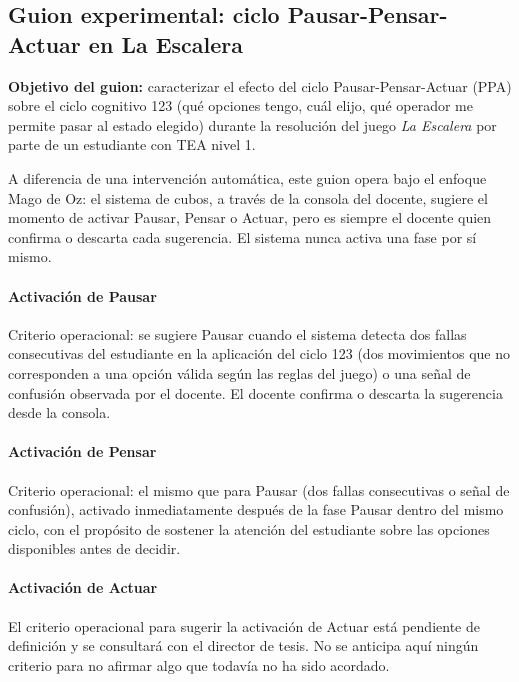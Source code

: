 \documentclass{book}
\begin{document}
\subsection{Guion experimental: ciclo Pausar-Pensar-Actuar en La Escalera}

\textbf{Objetivo del guion:} caracterizar el efecto del ciclo Pausar-Pensar-Actuar (PPA) sobre el ciclo cognitivo 123 (qué opciones tengo, cuál elijo, qué operador me permite pasar al estado elegido) durante la resolución del juego \textit{La Escalera} por parte de un estudiante con TEA nivel 1.

A diferencia de una intervención automática, este guion opera bajo el enfoque Mago de Oz: el sistema de cubos, a través de la consola del docente, sugiere el momento de activar Pausar, Pensar o Actuar, pero es siempre el docente quien confirma o descarta cada sugerencia. El sistema nunca activa una fase por sí mismo.

\paragraph{Activación de Pausar}
Criterio operacional: se sugiere Pausar cuando el sistema detecta dos fallas consecutivas del estudiante en la aplicación del ciclo 123 (dos movimientos que no corresponden a una opción válida según las reglas del juego) o una señal de confusión observada por el docente. El docente confirma o descarta la sugerencia desde la consola.

\paragraph{Activación de Pensar}
Criterio operacional: el mismo que para Pausar (dos fallas consecutivas o señal de confusión), activado inmediatamente después de la fase Pausar dentro del mismo ciclo, con el propósito de sostener la atención del estudiante sobre las opciones disponibles antes de decidir.

\paragraph{Activación de Actuar}
El criterio operacional para sugerir la activación de Actuar está pendiente de definición y se consultará con el director de tesis. No se anticipa aquí ningún criterio para no afirmar algo que todavía no ha sido acordado.
\end{document}
